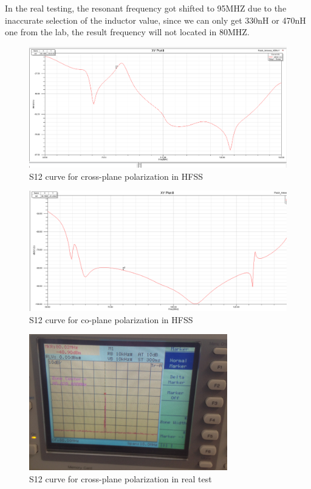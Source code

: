 In the real testing, the resonant frequency got shifted to 95MHZ due to the inaccurate selection of the inductor value, since we can only get 330nH or 470nH one from the lab, the result frequency will not located in 80MHZ.

\begin{figure}[h]
	\begin{center}
		\includegraphics[width=4.7in]{./images/efield_image9.png}
		\caption{ S12 curve for cross-plane polarization in HFSS}
		\label{fig:efield_fig11}
	\end{center}
\end{figure}

\begin{figure}[h]
	\begin{center}
		\includegraphics[width=4.7in]{./images/efield_image10.png}
		\caption{S12 curve for co-plane polarization in HFSS}
		\label{fig:efield_fig12}
	\end{center}
\end{figure}

\clearpage

\begin{figure}[h]
	\begin{center}
		\includegraphics[width=3.4in]{./images/efield_image11.png}
		\caption{S12 curve for cross-plane polarization in real test}
		\label{fig:efield_fig13}
	\end{center}
\end{figure}


